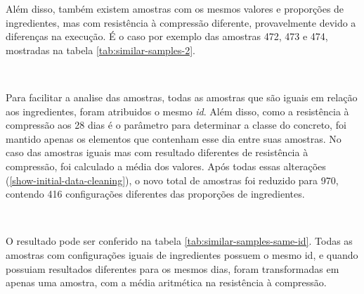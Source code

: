\documentclass[]{article}
\begin{document}
Além disso, também existem amostras com os mesmos valores e proporções
de ingredientes, mas com resistência à compressão diferente,
provavelmente devido a diferenças na execução. É o caso por exemplo das
amostras 472, 473 e 474, mostradas na tabela
\ref{tab:similar-samples-2}.

~

\begin{table}

\caption{\label{tab:similar-samples-2}Amostras iguais com resultados diferentes}
\centering
{}
\end{table}

Para facilitar a analise das amostras, todas as amostras que são iguais
em relação aos ingredientes, foram atribuidos o mesmo \emph{id}. Além
disso, como a resistência à compressão aos 28 dias é o parâmetro para
determinar a classe do concreto, foi mantido apenas os elementos que
contenham esse dia entre suas amostras. No caso das amostras iguais mas
com resultado diferentes de resistência à compressão, foi calculado a
média dos valores. Após todas essas alterações
(\ref{show-initial-data-cleaning}), o novo total de amostras foi
reduzido para 970, contendo 416 configurações diferentes das proporções
de ingredientes.

~

O resultado pode ser conferido na tabela
\ref{tab:similar-samples-same-id}. Todas as amostras com configurações
iguais de ingredientes possuem o mesmo id, e quando possuiam resultados
diferentes para os mesmos dias, foram transformadas em apenas uma
amostra, com a média aritmética na resistência à compressão.
\end{document}
